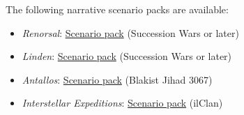 The following narrative scenario packs are available:

\begin{itemize}

\item \emph{Renorsal}: \href{https://raw.githubusercontent.com/Eudicods/outworlds-wastes/rules-pdf/renorsal.pdf}{Scenario pack} (Succession Wars or later)

\item \emph{Linden}: \href{https://raw.githubusercontent.com/Eudicods/outworlds-wastes/rules-pdf/linden.pdf}{Scenario pack} (Succession Wars or later)

\item \emph{Antallos}: \href{https://raw.githubusercontent.com/Eudicods/outworlds-wastes/rules-pdf/antallos.pdf}{Scenario pack} (Blakist Jihad 3067)

\item \emph{Interstellar Expeditions}: \href{https://raw.githubusercontent.com/Eudicods/outworlds-wastes/rules-pdf/interstellar-expeditions.pdf}{Scenario pack} (ilClan)

\end{itemize}
